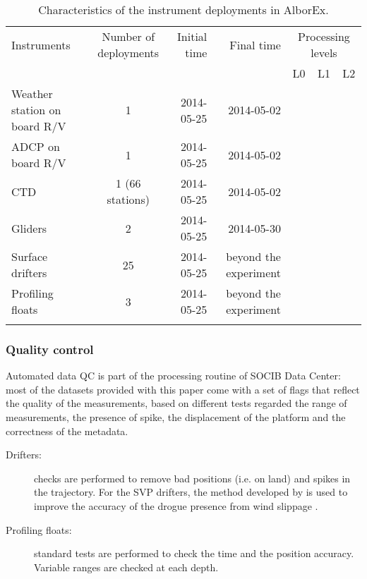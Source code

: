 \documentclass[essd]{copernicus}
\begin{document}
\begin{table*}[htpb]
\caption{Characteristics of the instrument deployments in AlborEx.\label{tab:deployment}}
\begin{tabular}{lcrrccc}
\tophline
Instruments 		& Number of deployments & Initial time	& Final time			& \multicolumn{3}{c}{Processing levels} \\
					& 						& 				& 						& L0 			& L1 		& L2 \\
\middlehline
Weather station on board R/V	& 1			& 2014-05-25	& 2014-05-02			& \checkmark	& \checkmark &  \\ 
ADCP on board R/V	& 1						& 2014-05-25	& 2014-05-02			& \checkmark	& \checkmark &  \\ 
CTD					& 1 (66 stations)		& 2014-05-25	& 2014-05-02			& \checkmark	& \checkmark &  \\ 
Gliders 			& 2						& 2014-05-25	& 2014-05-30 			& \checkmark 	& \checkmark & \checkmark \\
Surface drifters	& 25					& 2014-05-25	& beyond the experiment & \checkmark 	& \checkmark &  \\
Profiling floats	& 3						& 2014-05-25	& beyond the experiment & \checkmark 	& \checkmark &  \\
\bottomhline
\end{tabular}
\belowtable{} %
\end{table*}

\subsubsection{Quality control}

Automated data QC is part of the processing routine of SOCIB Data Center: most of the datasets provided with this paper come with a set of flags that reflect the quality of the measurements, based on different tests regarded the range of measurements, the presence of spike, the displacement of the platform and the correctness of the metadata. 

\begin{description}
\item[Drifters:] checks are performed to remove bad positions (i.e. on land) and spikes in the trajectory. For the SVP drifters, the method developed by \citep{RIO12} is used to improve the accuracy of the drogue presence from wind slippage \citep{MENNA18}.
\item[Profiling floats:] standard tests are performed to check the time and the position accuracy. Variable ranges are checked at each depth.
\end{description}
\end{document}
